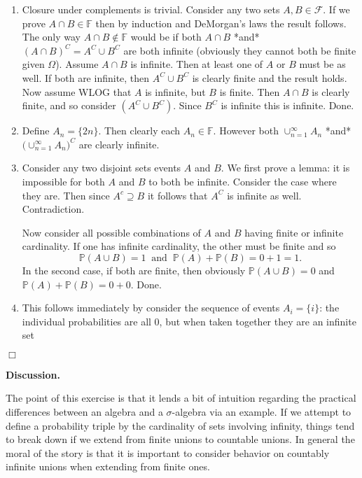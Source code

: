 \documentclass{article}
\begin{document}
\begin{enumerate}

\item Closure under complements is trivial. Consider any two sets $A, B \in \mathcal{F}$. If we prove $A \cap B \in \mathbb{F}$ then by induction and DeMorgan's laws the result follows. The only way $A \cap B \notin \mathbb{F}$ would be if both $A \cap B$ *and* $(A \cap B)^C = A^C \cup B^C$ are both infinite (obviously they cannot both be finite given $\Omega$). Assume $A \cap B$ is infinite. Then at least one of $A$ or $B$ must be as well. If both are infinite, then $A^C \cup B^C$ is clearly finite and the result holds. Now assume WLOG that $A$ is infinite, but $B$ is finite. Then $A \cap B$ is clearly finite, and so consider $(A^C \cup B^C)$. Since $B^C$ is infinite this is infinite. Done. 

\item Define $A_n = \{2n\}$. Then clearly each $A_n \in \mathbb{F}$. However both $\cup_{n = 1}^{\infty} A_n$ *and* $\Big(\cup_{n = 1}^{\infty} A_n\Big)^C$ are clearly infinite. 

\item Consider any two disjoint sets events $A$ and $B$. We first prove a lemma: it is impossible for both $A$ and $B$ to both be infinite. Consider the case where they are. Then since $A^c \supseteq B$ it follows that $A^C$ is infinite as well. Contradiction. 

Now consider all possible combinations of $A$ and $B$ having finite or infinite cardinality. If one has infinite cardinality, the other must be finite and so \[\mathbb{P}(A \cup B) = 1 \;\; \text{and} \;\; \mathbb{P}(A) + \mathbb{P}(B) = 0 + 1 = 1. \] In the second case, if both are finite, then obviously $\mathbb{P}(A \cup B) = 0$ and $\mathbb{P}(A) + \mathbb{P}(B) = 0 + 0$. Done.  

\item This follows immediately by consider the sequence of events $A_i = \{i\}$: the individual probabilities are all 0, but when taken together they are an infinite set

\end{enumerate}

\hfill $\Box$

\bigskip

\noindent \textbf{Discussion.} 

\medskip

The point of this exercise is that it lends a bit of intuition regarding the practical differences between an algebra and a $\sigma$-algebra via an example. If we attempt to define a probability triple by the cardinality of sets involving infinity, things tend to break down if we extend from finite unions to countable unions. In general the moral of the story is that it is important to consider behavior on countably infinite unions when extending from finite ones. 
\end{document}
